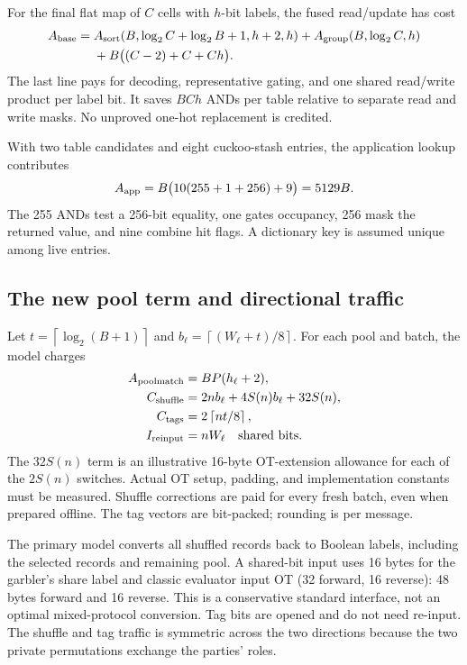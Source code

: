 \documentclass[11pt]{article}
\newcommand{\ceil}[1]{\left\lceil #1\right\rceil}
\begin{document}
For the final flat map of $C$ cells with $h$-bit labels, the fused read/update
has cost
\begin{align}
 A_{\rm base}={}&A_{\rm sort}(B,\log_2C+\log_2B+1,h+2,h)
    +A_{\rm group}(B,\log_2C,h)\nonumber\\
 &+B\bigl((C-2)+C+Ch\bigr).
\end{align}
The last line pays for decoding, representative gating, and one shared
read/write product per label bit. It saves $BCh$ ANDs per table relative
to separate read and write masks. No unproved one-hot replacement is credited.

With two table candidates and eight cuckoo-stash entries, the application
lookup contributes
\begin{equation}
 A_{\rm app}=B\bigl(10(255+1+256)+9\bigr)=5129B.
\end{equation}
The 255 ANDs test a 256-bit equality, one gates occupancy, 256 mask the
returned value, and nine combine hit flags. A dictionary key is assumed
unique among live entries.

\subsection{The new pool term and directional traffic}
Let $t=\ceil{\log_2(B+1)}$ and
$b_\ell=\ceil{(W_\ell+t)/8}$. For each pool and batch, the model charges
\begin{align}
 A_{\rm poolmatch}&=BP(h_\ell+2),\\
 C_{\rm shuffle}&=2nb_\ell+4S(n)b_\ell+32S(n),\\
 C_{\rm tags}&=2\ceil{nt/8},\\
 I_{\rm reinput}&=nW_\ell\quad\text{shared bits}.
\end{align}
The $32S(n)$ term is an illustrative 16-byte OT-extension allowance for each
of the $2S(n)$ switches. Actual OT setup, padding, and implementation constants
must be measured. Shuffle corrections are paid for every fresh batch, even
when prepared offline. The tag vectors are bit-packed; rounding is per
message.

The primary model converts all shuffled records back to Boolean labels,
including the selected records and remaining pool. A shared-bit input uses
16 bytes for the garbler's share label and classic evaluator input OT
(32 forward, 16 reverse): 48 bytes forward and 16 reverse. This is a
conservative standard interface, not an optimal mixed-protocol conversion.
Tag bits are opened and do not need re-input. The shuffle and tag traffic is
symmetric across the two directions because the two private permutations
exchange the parties' roles.
\end{document}
